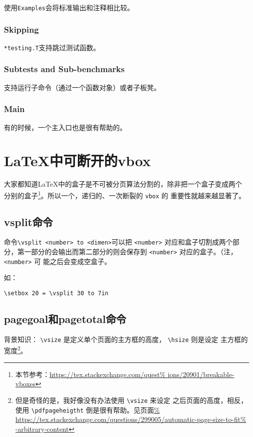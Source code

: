 使用\verb|Examples|会将标准输出和注释相比较。

\subsubsection{Skipping}

\verb|*testing.T|支持跳过测试函数。

\subsubsection{Subtests and Sub-benchmarks}

支持运行子命令（通过一个函数对象）或者子板凳。

\subsubsection{Main}

有的时候，一个主入口也是很有帮助的。


\section{\LaTeX{}中可断开的vbox}

大家都知道\LaTeX{}中的盒子是不可被分页算法分割的，除非把一个盒子变成两个
分别的盒子\footnote{本节参考：\url{https://tex.stackexchange.com/quest%
ions/20901/breakable-vboxes}}。所以一个，递归的、一次断裂的 \verb|vbox| 的
重要性就越来越显著了。

\subsection{vsplit命令}

\def\num{ \verb|<number>| }\def\dim{ \verb|<dimen>| }
命令\verb|\vsplit <number> to <dimen>|可以把\num 对应和盒子切割成两个部
分，第一部分的会输出而第二部分的则会保存到\num 对应的盒子。（注，\num 可
能之后会变成空盒子。

如：
\begin{lstlisting}
\setbox 20 = \vsplit 30 to 7in
\end{lstlisting}

\subsection{pagegoal和pagetotal命令}

背景知识： \verb|\vsize| 是定义单个页面的主方框的高度， \verb|\hsize| 则是设定
主方框的宽度\footnote{但是奇怪的是，我好像没有办法使用 \verb|\vsize| 来设定
之后页面的高度，相反，使用 \verb|\pdfpageheigtht| 倒是很有帮助。见页面\url{%
https://tex.stackexchange.com/questions/299005/automatic-page-size-to-fit%
-arbitrary-content}}。

